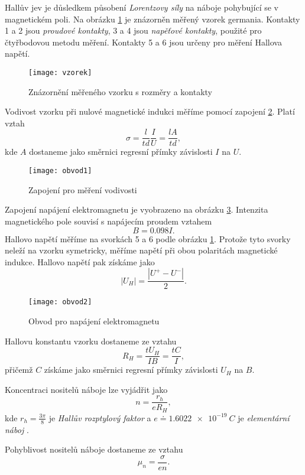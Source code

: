 \documentclass[0-protokol.tex]{subfiles}
\begin{document}
Hallův jev je důsledkem působení \textit{Lorentzovy síly} na náboje pohybující se v magnetickém poli. Na obrázku \ref{fig:vzorek} je znázorněn měřený vzorek germania. Kontakty 1 a 2 jsou \textit{proudové kontakty}, 3 a 4 jsou \textit{napěťové kontakty}, použité pro čtyřbodovou metodu měření. Kontakty 5 a 6 jsou určeny pro měření Hallova napětí.

\begin{figure}[H]
\centering
\texttt{[image: vzorek]}
\caption{Znázornění měřeného vzorku s rozměry a kontakty \cite{stud_text}}
\label{fig:vzorek}
\end{figure}

Vodivost vzorku při nulové magnetické indukci měříme pomocí zapojení \ref{fig:obvod1}. Platí vztah
\begin{equation} \label{eq:sigma}
\sigma = \frac{l}{td}\frac{I}{U} = \frac{lA}{td},
\end{equation}
kde $A$ dostaneme jako směrnici regresní přímky závislosti $I$ na $U$.

\begin{figure}[H]
\centering
\texttt{[image: obvod1]}
\caption{Zapojení pro měření vodivosti \cite{stud_text}}
\label{fig:obvod1}
\end{figure}

Zapojení napájení elektromagnetu je vyobrazeno na obrázku \ref{fig:obvod2}. Intenzita magnetického pole souvisí s napájecím proudem vztahem
\begin{equation} \label{eq:indukce}
B = \num{0,098}I.
\end{equation}
Hallovo napětí měříme na svorkách 5 a 6 podle obrázku \ref{fig:vzorek}. Protože tyto svorky neleží na vzorku symetricky, měříme napětí při obou polaritách magnetické indukce. Hallovo napětí pak získáme jako 
\begin{equation} \label{eq:U_H}
|U_H| = \frac{|U^+ - U^-|}{2}.
\end{equation}

\begin{figure}[H]
\centering
\texttt{[image: obvod2]}
\caption{Obvod pro napájení elektromagnetu \cite{stud_text}}
\label{fig:obvod2}
\end{figure}

Hallovu konstantu vzorku dostaneme ze vztahu
\begin{equation} \label{eq:R_H}
R_H = \frac{t U_H}{IB} = \frac{t C}{I},
\end{equation}
přičemž $C$ získáme jako směrnici regresní přímky závislosti $U_H$ na $B$.

Koncentraci nositelů náboje lze vyjádřit jako
\begin{equation} \label{eq:n}
n = \frac{r_h}{e R_H},
\end{equation}
kde $r_h = \frac{3 \pi}{8}$ je \textit{Hallův rozptylový faktor} \cite{stud_text} a $e \doteq \SI{1.6022e-19}{C}$ je \textit{elementární náboj} \cite{elem_naboj}.

Pohyblivost nositelů náboje dostaneme ze vztahu
\begin{equation} \label{eq:mu_n}
\mu_n = \frac{\sigma}{e n}.
\end{equation}
\end{document}
